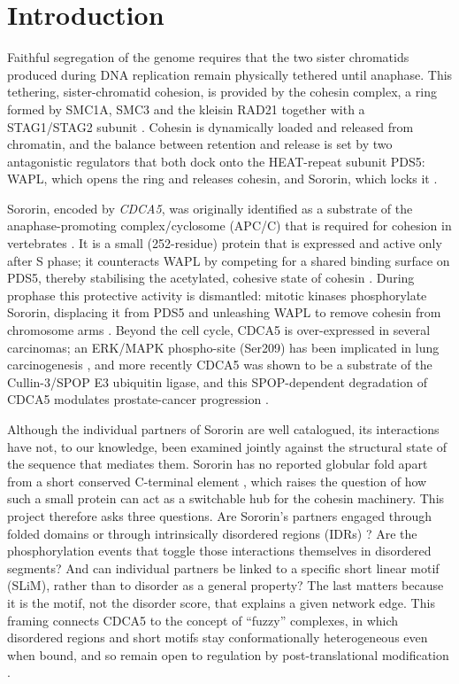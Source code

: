\documentclass[11pt]{article}
\begin{document}
\section{Introduction}

Faithful segregation of the genome requires that the two sister chromatids produced during DNA replication remain physically tethered until anaphase. This tethering, sister-chromatid cohesion, is provided by the cohesin complex, a ring formed by SMC1A, SMC3 and the kleisin RAD21 together with a STAG1/STAG2 subunit \citep{nasmyth2009}. Cohesin is dynamically loaded and released from chromatin, and the balance between retention and release is set by two antagonistic regulators that both dock onto the HEAT-repeat subunit PDS5: WAPL, which opens the ring and releases cohesin, and Sororin, which locks it \citep{nishiyama2010,ouyang2016}.

Sororin, encoded by \textit{CDCA5}, was originally identified as a substrate of the anaphase-promoting complex/cyclosome (APC/C) that is required for cohesion in vertebrates \citep{rankin2005}. It is a small (252-residue) protein that is expressed and active only after S phase; it counteracts WAPL by competing for a shared binding surface on PDS5, thereby stabilising the acetylated, cohesive state of cohesin \citep{nishiyama2010}. During prophase this protective activity is dismantled: mitotic kinases phosphorylate Sororin, displacing it from PDS5 and unleashing WAPL to remove cohesin from chromosome arms \citep{nishiyama2013,dreier2011}. Beyond the cell cycle, CDCA5 is over-expressed in several carcinomas; an ERK/MAPK phospho-site (Ser209) has been implicated in lung carcinogenesis \citep{nguyen2010}, and more recently CDCA5 was shown to be a substrate of the Cullin-3/SPOP E3 ubiquitin ligase, and this SPOP-dependent degradation of CDCA5 modulates prostate-cancer progression \citep{zhang2021}.

Although the individual partners of Sororin are well catalogued, its interactions have not, to our knowledge, been examined jointly against the structural state of the sequence that mediates them. Sororin has no reported globular fold apart from a short conserved C-terminal element \citep{wu2011}, which raises the question of how such a small protein can act as a switchable hub for the cohesin machinery. This project therefore asks three questions. Are Sororin's partners engaged through folded domains or through intrinsically disordered regions (IDRs) \citep{vanderlee2014}? Are the phosphorylation events that toggle those interactions themselves in disordered segments? And can individual partners be linked to a specific short linear motif (SLiM), rather than to disorder as a general property? The last matters because it is the motif, not the disorder score, that explains a given network edge. This framing connects CDCA5 to the concept of ``fuzzy'' complexes, in which disordered regions and short motifs stay conformationally heterogeneous even when bound, and so remain open to regulation by post-translational modification \citep{tompa2008,fuxreiter2018,wright2015}.
\end{document}
